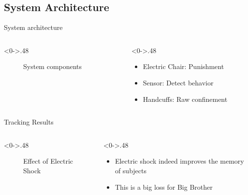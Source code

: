 \documentclass{beamer}
\begin{document}
\subsection{System Architecture}
\begin{frame}{System architecture}
  \begin{columns}[T] %
    \begin{column}<0->{.48\textwidth}
      \begin{figure}[thpb]
        \centering
        \caption{System components}
        \label{fig:system}
      \end{figure}
    \end{column}%
    \hfill%
    \begin{column}<0->{.48\textwidth}
      \begin{itemize}
        \item Electric Chair: Punishment
        \item Sensor: Detect behavior
        \item Handcuffs: Raw confinement
      \end{itemize}
    \end{column}%
  \end{columns}
\end{frame}
\begin{frame}{Tracking Results}
  \begin{columns}[T] %
    \begin{column}<0->{.48\textwidth}
    \begin{figure}[thpb]
      \centering
      \caption{Effect of Electric Shock}
      \label{fig:stimulus}
    \end{figure}
    \end{column}
    \begin{column}<0->{.48\textwidth}
      \begin{itemize}
        \item Electric shock indeed improves the memory of subjects
        \item This is a big loss for Big Brother
      \end{itemize}
    \end{column}
  \end{columns}
\end{frame}
\end{document}
